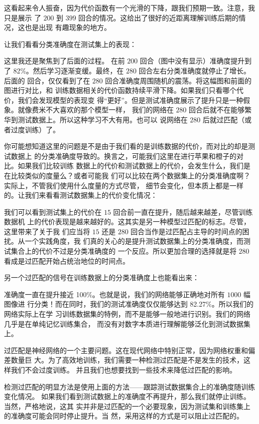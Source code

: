 这看起来令人振奋，因为代价函数有一个光滑的下降，跟我们预期一致。注意，我只是展示
了 $200$ 到 $399$ 回合的情况。这给出了很好的近距离理解训练后期的情况，这也是出现
有趣现象的地方。

让我们看看分类准确度在测试集上的表现：

这里我还是聚焦到了后面的过程。 在前 $200$ 回合（图中没有显示）准确度提升到
了 82\%。然后学习逐渐变缓。最终，在 $280$ 回合左右分类准确度就停止了增长。后面的
回合，仅仅看到了在 $280$ 回合准确度周围随机的震荡。将这幅图和前面的图进行对比，和
训练数据相关的代价函数持续平滑下降。如果我们只看哪个代价，我们会发现模型的表现变
得“更好”。但是测试准确度展示了提升只是一种假象。就像费米不大喜欢的那个模型一样，
我们的网络在 $280$ 回合后就不在能够繁华到测试数据上。所以这种学习不大有用。也可以
说网络在 $280$ 后就过匹配（或者过度训练）了。

你可能想知道这里的问题是不是由于我们看的是训练数据的代价，而对比的却是测试数据上
的分类准确度导致的。换言之，可能我们这里在进行苹果和橙子的对比。如果我们比较训练
数据上的代价和测试数据上的代价，会发生什么，我们是在比较类似的度量么？或者可能我
们可以比较在两个数据集上的分类准确度啊？实际上，不管我们使用什么度量的方式尽管，
细节会变化，但本质上都是一样的。让我们来看看测试数据集上的代价变化情况：

我们可以看到测试集上的代价在 $15$ 回合前一直在提升，随后越来越差，尽管训练数据机
上的代价表现是越来越好的。这其实是另一种模型过匹配的标志。尽管，这里带来了关于我
们应当将 $15$ 还是 $280$ 回合当作是过匹配占主导的时间点的困扰。从一个实践角度，我
们真的关心的是提升测试数据集上的分类准确度，而测试集合上的代价不过是分类准确度的
一个反应。所以更加合理的选择就是将 $280$ 看成是过匹配开始占统治地位的时间点。

另一个过匹配的信号在训练数据上的分类准确度上也能看出来：

准确度一直在提升接近 100\%。也就是说，我们的网络能够正确地对所有 $1000$ 幅图像进
行分类！而在同时，我们的测试准确度仅仅能够达到 82.27\%。所以我们的网络实际上在学
习训练数据集的特例，而不是能够一般地进行识别。我们的网络几乎是在单纯记忆训练集合，
而没有对数字本质进行理解能够泛化到测试数据集上。

过匹配是神经网络的一个主要问题。这在现代网络中特别正常，因为网络权重和偏差数量巨
大。为了高效地训练，我们需要一种检测过匹配是不是发生的技术，这样我们不会过度训练。
并且我们也想要找到一些技术来降低过匹配的影响。

检测过匹配的明显方法是使用上面的方法——跟踪测试数据集合上的准确度随训练变化情况。
如果我们看到测试数据上的准确度不再提升，那么我们就停止训练。当然，严格地说，这其
实并非是过匹配的一个必要现象，因为测试集和训练集上的准确度可能会同时停止提升。当
然，采用这样的方式是可以阻止过匹配的。


